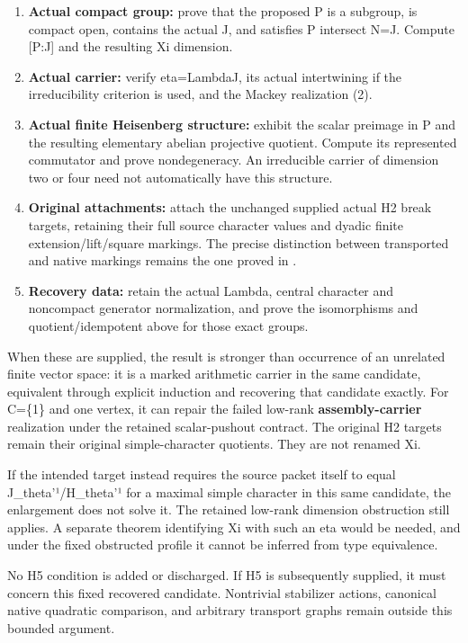 \begin{enumerate}
\def\labelenumi{\arabic{enumi}.}
\tightlist
\item
  \textbf{Actual compact group:} prove that the proposed P is a
  subgroup, is compact open, contains the actual J, and satisfies P
  intersect N=J. Compute {[}P:J{]} and the resulting Xi dimension.
\item
  \textbf{Actual carrier:} verify eta=Lambda\textbar J, its actual
  intertwining if the irreducibility criterion is used, and the Mackey
  realization (2).
\item
  \textbf{Actual finite Heisenberg structure:} exhibit the scalar
  preimage in P and the resulting elementary abelian projective
  quotient. Compute its represented commutator and prove nondegeneracy.
  An irreducible carrier of dimension two or four need not automatically
  have this structure.
\item
  \textbf{Original attachments:} attach the unchanged supplied actual H2
  break targets, retaining their full source character values and dyadic
  finite extension/lift/square markings. The precise distinction between transported and native markings remains the one proved in
  .
\item
  \textbf{Recovery data:} retain the actual Lambda, central character
  and noncompact generator normalization, and prove the isomorphisms and
  quotient/idempotent above for those exact groups.
\end{enumerate}

When these are supplied, the result is stronger than occurrence of an
unrelated finite vector space: it is a marked arithmetic carrier in the
same candidate, equivalent through explicit induction and recovering
that candidate exactly. For C=\{1\} and one vertex, it can repair the
failed low-rank \textbf{assembly-carrier} realization under the retained
scalar-pushout contract. The original H2 targets remain their original simple-character quotients. They are not renamed Xi.

If the intended target instead requires the source packet itself to
equal J\_theta'¹/H\_theta'¹ for a maximal simple character in this same
candidate, the enlargement does not solve it. The retained low-rank
dimension obstruction still applies. A separate theorem identifying Xi
with such an eta would be needed, and under the fixed obstructed profile
it cannot be inferred from type equivalence.

No H5 condition is added or discharged. If H5 is subsequently supplied,
it must concern this fixed recovered candidate. Nontrivial stabilizer
actions, canonical native quadratic comparison, and arbitrary transport
graphs remain outside this bounded argument.

